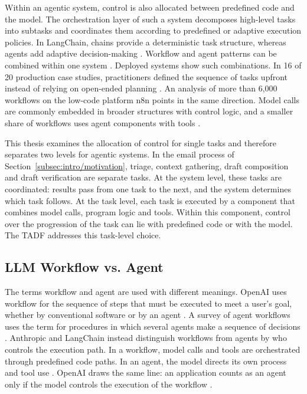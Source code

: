 Within an agentic system, control is also allocated between predefined code and the model. The orchestration layer of such a system decomposes high-level tasks into subtasks and coordinates them according to predefined or adaptive execution policies. In LangChain, chains provide a deterministic task structure, whereas agents add adaptive decision-making \parencite{sapkotaLangChainVsLangGraph2025}. Workflow and agent patterns can be combined within one system \parencite{schluntzBuildingEffectiveAI2024}. Deployed systems show such combinations. In 16 of 20 production case studies, practitioners defined the sequence of tasks upfront instead of relying on open-ended planning  \parencite{panMeasuringAgentsProduction2025}. An analysis of more than 6,000 workflows on the low-code platform n8n points in the same direction. Model calls are commonly embedded in broader structures with control logic, and a smaller share of workflows uses agent components with tools 
\parencite{tangCharacterizingLargeLanguage2026}.

This thesis examines the allocation of control for single tasks and therefore separates two levels for agentic systems. In the email process of Section~\ref{subsec:intro/motivation}, triage, context gathering, draft composition and draft verification are separate tasks. At the system level, these tasks are coordinated: results pass from one task to the next, and the system determines which task follows. At the task level, each task is executed by a component that combines model calls, program logic and tools. Within this component, control over the progression of the task can lie with predefined code or with the model. The TADF addresses this task-level choice. 

\subsection{LLM Workflow vs. Agent}
\label{subsec:theory/workflows-agents}

The terms workflow and agent are used with different meanings. OpenAI uses workflow for the sequence of steps that must be executed to meet a user's goal, whether by conventional software or by an agent \parencite{openaiPracticalGuideAgents2026}. A survey of agent workflows uses the term for procedures in which several agents make a sequence of decisions \parencite{yuSurveyAgentWorkflow2025}. Anthropic and LangChain instead distinguish workflows from agents by who controls the execution path. In a workflow, model calls and tools are orchestrated through predefined code paths. In an agent, the model directs its own process and tool use \parencite{schluntzBuildingEffectiveAI2024,Workflowsandgents}. OpenAI draws the same line: an application counts as an agent only if the model controls the execution of the workflow \parencite{openaiPracticalGuideAgents2026}.


